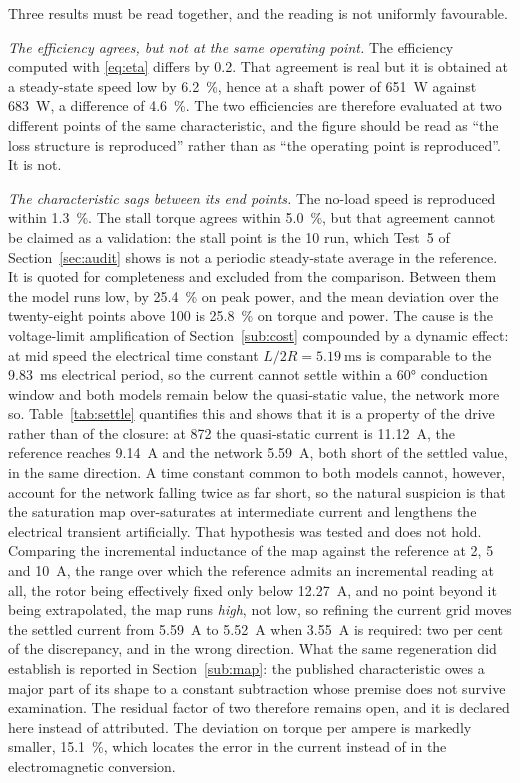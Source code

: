\documentclass[10pt,a4paper,twocolumn]{article}
\theoremstyle{plain}
\theoremstyle{remark}
\begin{document}
Three results must be read together, and the reading is not uniformly
favourable.

\emph{The efficiency agrees, but not at the same operating point.} The
efficiency computed with \eqref{eq:eta} differs by \SI{0.2}{\pp}. That
agreement is real but it is obtained at a steady-state speed low by
\SI{6.2}{\percent}, hence at a shaft power of \SI{651}{\watt} against
\SI{683}{\watt}, a difference of \SI{4.6}{\percent}. The two
efficiencies are therefore evaluated at two different points of the
same characteristic, and the figure should be read as ``the loss
structure is reproduced'' rather than as ``the operating point is
reproduced''. It is not.

\emph{The characteristic sags between its end points.} The no-load speed
is reproduced within \SI{1.3}{\percent}. The stall torque agrees within
\SI{5.0}{\percent}, but that agreement cannot be claimed as a
validation: the stall point is the \SI{10}{\rpm} run, which Test~5 of
Section~\ref{sec:audit} shows is not a periodic steady-state average in
the reference. It is quoted for completeness and excluded from the
comparison. Between
them the model runs low, by \SI{25.4}{\percent} on peak power, and the
mean deviation over the twenty-eight points above \SI{100}{\rpm} is
\SI{25.8}{\percent} on torque and power. The cause is the
voltage-limit amplification of Section~\ref{sub:cost} compounded by a
dynamic effect: at mid speed the electrical time constant
$L/2R=\SI{5.19}{\milli\second}$ is comparable to the
\SI{9.83}{\milli\second} electrical period, so the current cannot settle
within a \ang{60} conduction window and both models remain below the
quasi-static value, the network more so. Table~\ref{tab:settle}
quantifies this and shows that it is a property of the drive rather than
of the closure: at \SI{872}{\rpm} the quasi-static current is
\SI{11.12}{\ampere}, the reference reaches \SI{9.14}{\ampere} and the
network \SI{5.59}{\ampere}, both short of the settled value, in the
same direction. A time constant common to both models cannot, however,
account for the network falling twice as far short, so the natural
suspicion is that the saturation map over-saturates at intermediate
current and lengthens the electrical transient artificially. That
hypothesis was tested and does not hold. Comparing the incremental
inductance of the map against the reference at
\SI{2}{}, \SI{5}{} and \SI{10}{\ampere}, the range over which the reference admits an
incremental reading at all, the rotor being effectively fixed only below
\SI{12.27}{\ampere}, and no point beyond it being extrapolated, the map
runs \emph{high}, not low, so refining the current grid moves the
settled current from \SI{5.59}{\ampere} to \SI{5.52}{\ampere} when
\SI{+3.55}{\ampere} is required: two per cent of the discrepancy, and in
the wrong direction. What the same regeneration did establish is
reported in Section~\ref{sub:map}: the published characteristic owes a
major part of its shape to a constant subtraction whose premise does not
survive examination. The residual factor of two therefore remains open,
and it is declared here instead of attributed. The deviation on torque per ampere is markedly smaller,
\SI{15.1}{\percent}, which locates the error in the current instead of
in the electromagnetic conversion.
\end{document}
